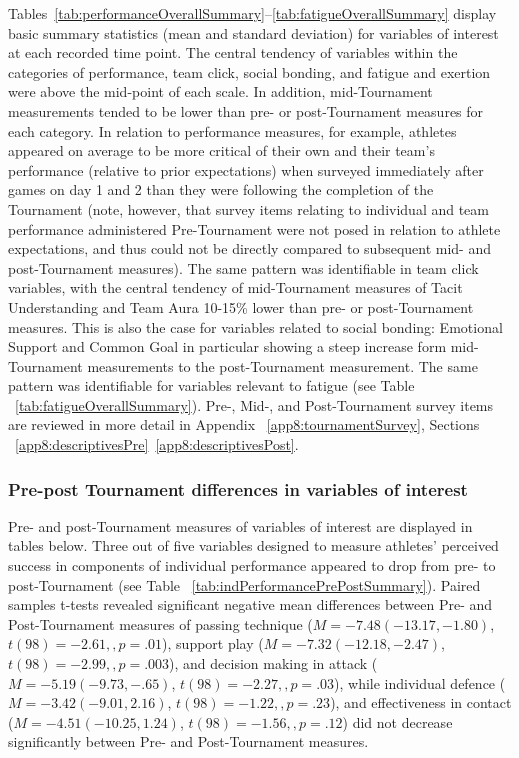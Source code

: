 \begin{CJK}{UTF8}{gbsn}
Tables~\ref{tab:performanceOverallSummary}\nobreakdash--\ref{tab:fatigueOverallSummary} display basic summary statistics (mean and standard deviation) for variables of interest at each recorded time point. The central tendency of variables within the categories of performance, team click, social bonding, and fatigue and exertion were above the mid-point of each scale. In addition, mid-Tournament measurements tended to be lower than pre- or post-Tournament measures for each category. In relation to performance measures, for example, athletes appeared on average to be more critical of their own and their team’s performance (relative to prior expectations) when surveyed immediately after games on day 1 and 2 than they were following the completion of the Tournament (note, however, that survey items relating to individual and team performance administered Pre-Tournament were not posed in relation to athlete expectations, and thus could not be directly compared to subsequent mid- and post-Tournament measures). The same pattern was identifiable in team click variables, with the central tendency of mid-Tournament measures of Tacit Understanding and Team Aura 10-15\% lower than pre- or post-Tournament measures. This is also the case for variables related to social bonding: Emotional Support and Common Goal in particular showing a steep increase form mid-Tournament measurements to the post-Tournament measurement. The same pattern was identifiable for variables relevant to fatigue (see Table ~\ref{tab:fatigueOverallSummary}).
Pre-, Mid-, and Post-Tournament survey items are reviewed in more detail in Appendix ~\ref{app8:tournamentSurvey}, Sections ~\ref{app8:descriptivesPre}\nobreakdash~\ref{app8:descriptivesPost}.




%


\subsubsection{Pre-post Tournament differences in variables of interest}
Pre- and post-Tournament measures of variables of interest are displayed in tables below.  Three out of five variables designed to measure athletes' perceived success in components of individual performance appeared to drop from pre- to post-Tournament (see Table ~\ref{tab:indPerformancePrePostSummary}).  Paired samples t-tests revealed significant negative mean differences between Pre- and Post-Tournament measures of passing technique ($M = -7.48 (-13.17, -1.80)$, $t(98)= -2.61,, p = .01$), support play ($M = -7.32 (-12.18, -2.47)$, $t(98)= -2.99,, p = .003$), and decision making in attack ($M = -5.19 ( -9.73, -.65)$, $t(98)= -2.27,, p = .03$), while individual defence ($M = -3.42 (-9.01, 2.16)$, $t(98)= -1.22,, p = .23$), and effectiveness in contact ($M = -4.51 (-10.25, 1.24)$, $t(98)= -1.56,, p = .12$) did not decrease significantly between Pre- and Post-Tournament measures.


\end{CJK}
